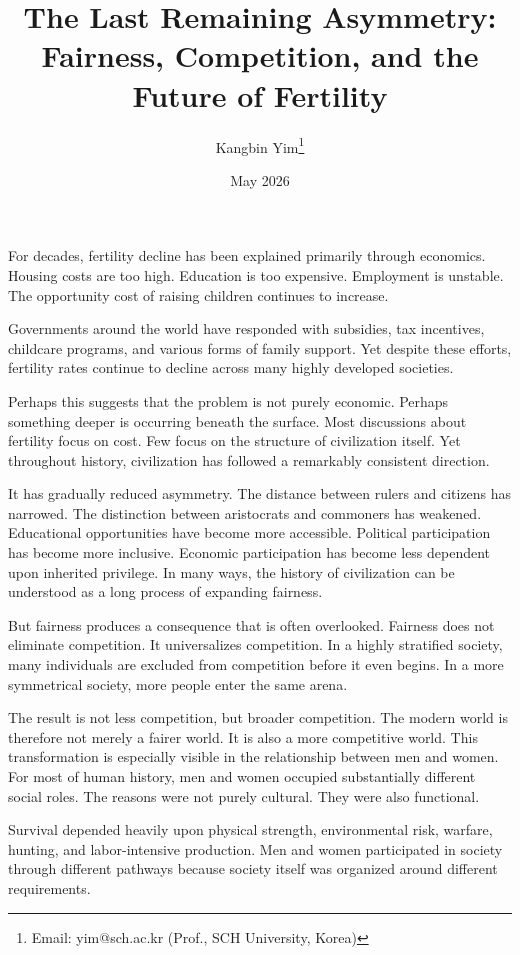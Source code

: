 \documentclass[12pt]{article}
\title{The Last Remaining Asymmetry:\\Fairness, Competition, and the Future of Fertility}
\author{Kangbin Yim\thanks{Email: yim@sch.ac.kr (Prof., SCH University, Korea)}}
\date{May 2026}
\begin{document}
\maketitle

For decades, fertility decline has been explained primarily through economics. Housing costs are too high. Education is too expensive. Employment is unstable.
The opportunity cost of raising children continues to increase.

Governments around the world have responded with subsidies, tax incentives, childcare programs, and various forms of family support. Yet despite these efforts, fertility rates continue to decline across many highly developed societies.

Perhaps this suggests that the problem is not purely economic. Perhaps something deeper is occurring beneath the surface. Most discussions about fertility focus on cost. Few focus on the structure of civilization itself.
Yet throughout history, civilization has followed a remarkably consistent direction.

It has gradually reduced asymmetry. The distance between rulers and citizens has narrowed. The distinction between aristocrats and commoners has weakened. Educational opportunities have become more accessible. Political participation has become more inclusive. Economic participation has become less dependent upon inherited privilege. In many ways, the history of civilization can be understood as a long process of expanding fairness.

But fairness produces a consequence that is often overlooked. Fairness does not eliminate competition. It universalizes competition. In a highly stratified society, many individuals are excluded from competition before it even begins. In a more symmetrical society, more people enter the same arena. 

The result is not less competition, but broader competition. The modern world is therefore not merely a fairer world. It is also a more competitive world. This transformation is especially visible in the relationship between men and women. For most of human history, men and women occupied substantially different social roles. The reasons were not purely cultural. They were also functional.

Survival depended heavily upon physical strength, environmental risk, warfare, hunting, and labor-intensive production. Men and women participated in society through different pathways because society itself was organized around different requirements.
\end{document}
